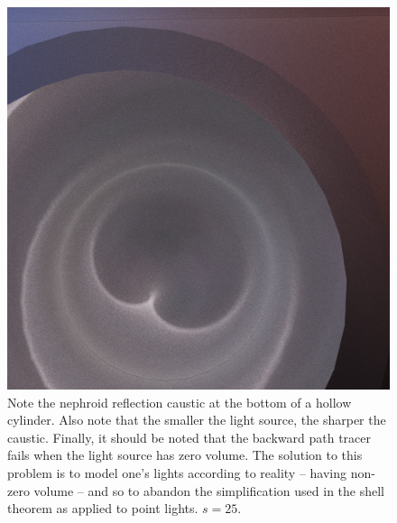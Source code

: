 \documentclass[12pt]{article}
\begin{document}
\begin{figure} 
\centering
  \includegraphics[width = 6 in]{fig8.png}
  \caption{ Note the nephroid reflection caustic at the bottom of a hollow cylinder.
Also note that the smaller the light source, the sharper the caustic.
Finally, it should be noted that the backward path tracer fails when the light source has zero volume.
The solution to this problem is to model one's lights according to reality -- having non-zero volume -- and so to abandon the simplification used in the shell theorem as applied to point lights.
$s = 25$.
}
\end{figure}
\end{document}
